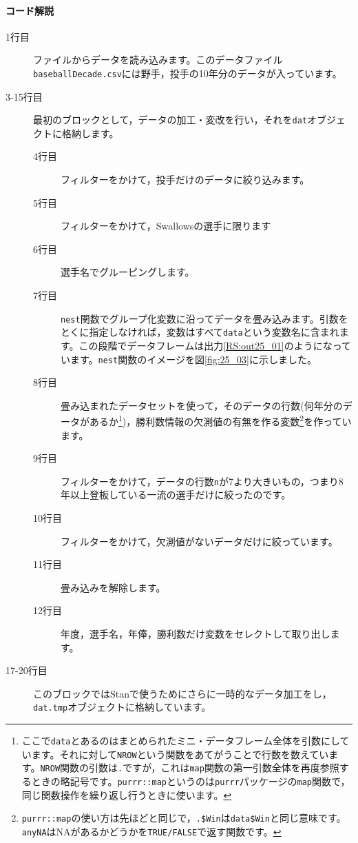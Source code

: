 \documentclass{ltjsbook}
\begin{document}
\paragraph{コード解説}
\begin{description}
	\item[1行目] ファイルからデータを読み込みます。このデータファイル\verb|baseballDecade.csv|には野手，投手の10年分のデータが入っています。
	\item[3-15行目] 最初のブロックとして，データの加工・変改を行い，それを\verb|dat|オブジェクトに格納します。
	      \begin{description}
		      \item[4行目] フィルターをかけて，投手だけのデータに絞り込みます。
		      \item[5行目] フィルターをかけて，Swallowsの選手に限ります
		      \item[6行目] 選手名でグルーピングします。
		      \item[7行目] \verb|nest|関数でグループ化変数に沿ってデータを畳み込みます。引数をとくに指定しなければ，変数はすべて\verb|data|という変数名に含まれます。この段階でデータフレームは出力\ref{RS:out25_01}のようになっています。\verb|nest|関数のイメージを図\ref{fig:25_03}に示しました。
		      \item[8行目] 畳み込まれたデータセットを使って，そのデータの行数(何年分のデータがあるか\footnote{ここで\verb|data|とあるのはまとめられたミニ・データフレーム全体を引数にしています。それに対して\verb|NROW|という関数をあてがうことで行数を数えています。\verb|NROW|関数の引数は\verb|.|ですが，これは\verb|map|関数の第一引数全体を再度参照するときの略記号です。\verb|purrr::map|というのは\verb|purrr|パッケージの\verb|map|関数で，同じ関数操作を繰り返し行うときに使います。})，勝利数情報の欠測値の有無を作る変数\footnote{\verb|purrr::map|の使い方は先ほどと同じで，\verb|.$Win|は\verb|data$Win|と同じ意味です。\verb|anyNA|はNAがあるかどうかを\verb|TRUE/FALSE|で返す関数です。}を作っています。
		      \item[9行目] フィルターをかけて，データの行数\verb|n|が7より大きいもの，つまり8年以上登板している一流の選手だけに絞ったのです。
		      \item[10行目] フィルターをかけて，欠測値がないデータだけに絞っています。
		      \item[11行目] 畳み込みを解除します。
		      \item[12行目] 年度，選手名，年俸，勝利数だけ変数をセレクトして取り出します。
	      \end{description}
	\item[17-20行目] このブロックではStanで使うためにさらに一時的なデータ加工をし，\verb|dat.tmp|オブジェクトに格納しています。

\end{description}
\end{document}
